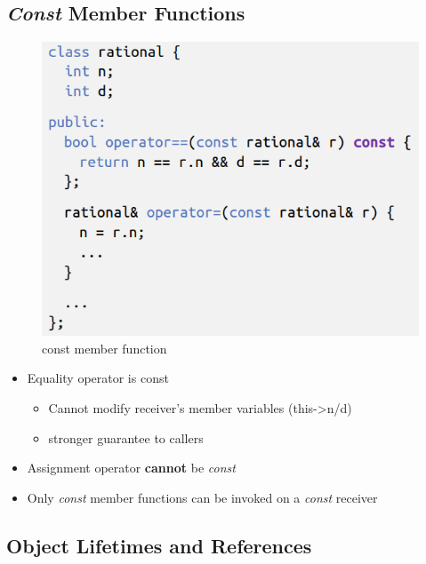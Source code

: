 \documentclass[a4paper,10pt]{article}
\begin{document}
\subsection{\textit{Const} Member Functions}
\begin{figure}[h]
    \centering
    \includegraphics[width=0.7\linewidth]{e14.png}
    \caption{const member function}
    \label{fig:enter-label}
\end{figure}
\begin{itemize}
    \item Equality operator is const
    \begin{itemize}
        \item Cannot modify receiver’s member
        variables (this->n/d)
        \item stronger guarantee to callers
    \end{itemize}
    \item Assignment operator \textbf{cannot} be \textit{const}
    \item Only \textit{const} member functions can be invoked on a \textit{const} receiver
\end{itemize}
\subsection{Object Lifetimes and References}
\end{document}
